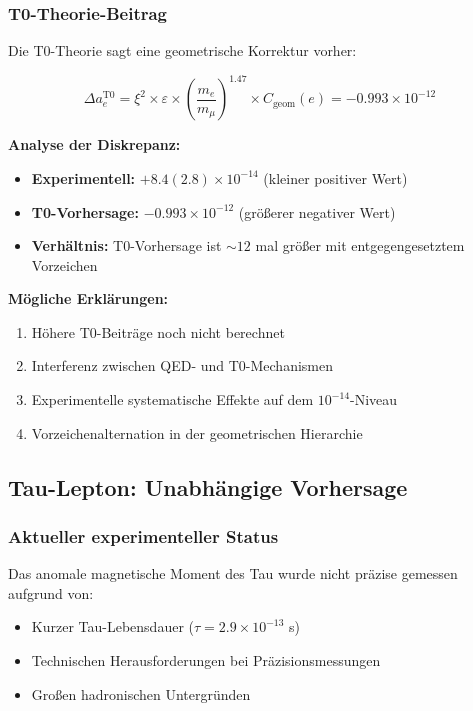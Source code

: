 \documentclass[12pt,a4paper]{article}
\numberwithin{equation}{section}
\newcommand{\xipar}{\xi}
\newcommand{\epsilonT}{\varepsilon}
\newcommand{\Cgeom}{C_{\text{geom}}}
\begin{document}
	\subsubsection{T0-Theorie-Beitrag}
	
	Die T0-Theorie sagt eine geometrische Korrektur vorher:
	
	\begin{equation}
		\Delta a_e^{\text{T0}} = \xipar^2 \times \epsilonT \times \left(\frac{m_e}{m_\mu}\right)^{1.47} \times \Cgeom(e) = -0.993 \times 10^{-12}
		\label{eq:electron_t0_contribution}
	\end{equation}
	
	\textbf{Analyse der Diskrepanz:}
	\begin{itemize}
		\item \textbf{Experimentell:} $+8.4(2.8) \times 10^{-14}$ (kleiner positiver Wert)
		\item \textbf{T0-Vorhersage:} $-0.993 \times 10^{-12}$ (größerer negativer Wert)
		\item \textbf{Verhältnis:} T0-Vorhersage ist $\sim 12$ mal größer mit entgegengesetztem Vorzeichen
	\end{itemize}
	
	\textbf{Mögliche Erklärungen:}
	\begin{enumerate}
		\item Höhere T0-Beiträge noch nicht berechnet
		\item Interferenz zwischen QED- und T0-Mechanismen
		\item Experimentelle systematische Effekte auf dem $10^{-14}$-Niveau
		\item Vorzeichenalternation in der geometrischen Hierarchie
	\end{enumerate}
	
	\subsection{Tau-Lepton: Unabhängige Vorhersage}
	
	\subsubsection{Aktueller experimenteller Status}
	
	Das anomale magnetische Moment des Tau wurde nicht präzise gemessen aufgrund von:
	\begin{itemize}
		\item Kurzer Tau-Lebensdauer ($\tau = 2.9 \times 10^{-13}$ s)
		\item Technischen Herausforderungen bei Präzisionsmessungen
		\item Großen hadronischen Untergründen
	\end{itemize}
	
\end{document}
